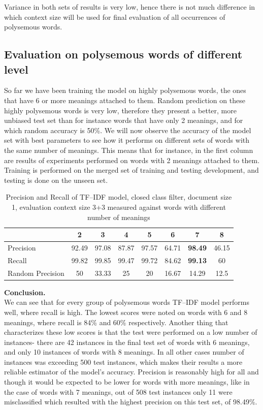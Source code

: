  Variance in both sets of results 
is very low, hence there is not much difference in which context size will be used for final evaluation
of all occurrences of polysemous words.


\subsection{ Evaluation on polysemous words of different level}
So far we have been training the model on highly polysemous words, the ones that have 6 or more 
meanings attached to them. Random prediction on these highly polysemous words is very low, therefore
they present a better, more unbiased test set than for instance words that have only 2 meanings, and 
for which random accuracy is 50\%. We will now observe the accuracy of the model set with best
parameters to see how it performs on different sets of words with the same number of meanings. This means
that for instance, in the first column are results of experiments performed on words with 2 meanings attached to them.
Training is performed on the merged set of training and testing development, and testing is done on the unseen set.

\begin{table}[h!]
\begin{tabular}{ l | c c c c c c c  }
     & 2 & 3 & 4 & 5 & 6& 7 & 8  \\
 \hline
Precision  & 92.49 & 97.08 & 87.87 & 97.57 & 64.71 & \textbf{98.49} & 46.15\\ 
Recall & 99.82 & 99.85 & 99.47 & 99.72 & 84.62 & \textbf{99.13} & 60\\ 
Random Precision & 50 & 33.33 & 25 & 20 & 16.67 & 14.29 & 12.5 \\
\end{tabular}
\caption{Precision and Recall of TF--IDF model, closed class filter, document size 1, evaluation context size 3+3 measured against words with different number of meanings}
\end{table} 

\textbf{Conclusion.}\\
We can see that for every group of polysemous words TF--IDF model performs well, where recall is high. The 
lowest scores were noted on words with 6 and 8 meanings, where recall is 84\% and 60\% respectively. Another 
thing that characterizes these low scores is that the test were performed on a low number of instances- there are 
42 instances in the final test set of words with 6 meanings, and only 10 instances of words with 8 meanings. In all other cases number of instances was exceeding 500 test instances, which makes their results a more reliable estimator of the model's accuracy. Precision is reasonably high for all and though it would be expected to be lower 
for words with more meanings, like in the case of words with 7 meanings, out of 508 test instances only 11 were misclassified which resulted with the highest precision on this test set, of  98.49\%.

